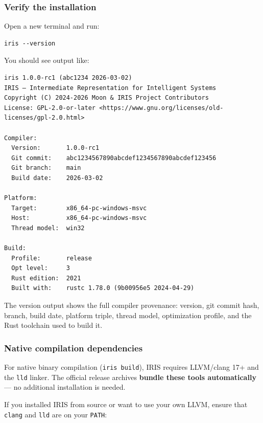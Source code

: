 \documentclass[
  english,
]{book}
\begin{document}
\subsubsection{Verify the installation}\label{verify-the-installation}

Open a new terminal and run:

\begin{verbatim}
iris --version
\end{verbatim}

You should see output like:

\begin{verbatim}
iris 1.0.0-rc1 (abc1234 2026-03-02)
IRIS — Intermediate Representation for Intelligent Systems
Copyright (C) 2024-2026 Moon & IRIS Project Contributors
License: GPL-2.0-or-later <https://www.gnu.org/licenses/old-licenses/gpl-2.0.html>

Compiler:
  Version:       1.0.0-rc1
  Git commit:    abc1234567890abcdef1234567890abcdef123456
  Git branch:    main
  Build date:    2026-03-02

Platform:
  Target:        x86_64-pc-windows-msvc
  Host:          x86_64-pc-windows-msvc
  Thread model:  win32

Build:
  Profile:       release
  Opt level:     3
  Rust edition:  2021
  Built with:    rustc 1.78.0 (9b00956e5 2024-04-29)
\end{verbatim}

The version output shows the full compiler provenance: version, git
commit hash, branch, build date, platform triple, thread model,
optimization profile, and the Rust toolchain used to build it.

\subsubsection{Native compilation
dependencies}\label{native-compilation-dependencies}

For native binary compilation (\texttt{iris\ build}), IRIS requires
LLVM/clang 17+ and the \texttt{lld} linker. The official release
archives \textbf{bundle these tools automatically} --- no additional
installation is needed.

If you installed IRIS from source or want to use your own LLVM, ensure
that \texttt{clang} and \texttt{lld} are on your \texttt{PATH}:
\end{document}
